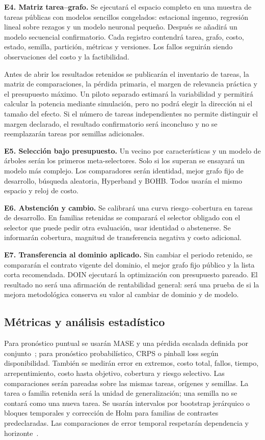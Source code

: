 \documentclass[11pt,letterpaper]{article}
\begin{document}
\textbf{E4. Matriz tarea--grafo.}
Se ejecutará el espacio completo en una muestra de tareas públicas con modelos sencillos congelados: estacional ingenuo, regresión lineal sobre rezagos y un modelo neuronal pequeño.
Después se añadirá un modelo secuencial confirmatorio.
Cada registro contendrá tarea, grafo, costo, estado, semilla, partición, métricas y versiones.
Los fallos seguirán siendo observaciones del costo y la factibilidad.

Antes de abrir los resultados retenidos se publicarán el inventario de tareas, la matriz de comparaciones, la pérdida primaria, el margen de relevancia práctica y el presupuesto máximo.
Un piloto separado estimará la variabilidad y permitirá calcular la potencia mediante simulación, pero no podrá elegir la dirección ni el tamaño del efecto.
Si el número de tareas independientes no permite distinguir el margen declarado, el resultado confirmatorio será inconcluso y no se reemplazarán tareas por semillas adicionales.

\textbf{E5. Selección bajo presupuesto.}
Un vecino por características y un modelo de árboles serán los primeros meta-selectores.
Solo si los superan se ensayará un modelo más complejo.
Los comparadores serán identidad, mejor grafo fijo de desarrollo, búsqueda aleatoria, Hyperband y BOHB.
Todos usarán el mismo espacio y reloj de costo.

\textbf{E6. Abstención y cambio.}
Se calibrará una curva riesgo--cobertura en tareas de desarrollo.
En familias retenidas se comparará el selector obligado con el selector que puede pedir otra evaluación, usar identidad o abstenerse.
Se informarán cobertura, magnitud de transferencia negativa y costo adicional.

\textbf{E7. Transferencia al dominio aplicado.}
Sin cambiar el periodo retenido, se compararán el contrato vigente del dominio, el mejor grafo fijo público y la lista corta recomendada.
DOIN ejecutará la optimización con presupuesto pareado.
El resultado no será una afirmación de rentabilidad general: será una prueba de si la mejora metodológica conserva su valor al cambiar de dominio y de modelo.

\subsection{Métricas y análisis estadístico}

Para pronóstico puntual se usarán MASE y una pérdida escalada definida por conjunto~\cite{hyndman2006mase}; para pronóstico probabilístico, CRPS o pinball loss según disponibilidad.
También se medirán error en extremos, costo total, fallos, tiempo, arrepentimiento, costo hasta objetivo, cobertura y riesgo selectivo.
Las comparaciones serán pareadas sobre las mismas tareas, orígenes y semillas.
La tarea o familia retenida será la unidad de generalización; una semilla no se contará como una nueva tarea.
Se usarán intervalos por bootstrap jerárquico o bloques temporales y corrección de Holm para familias de contrastes predeclaradas.
Las comparaciones de error temporal respetarán dependencia y horizonte~\cite{diebold1995accuracy,bergmeir2018cv}.
\end{document}
